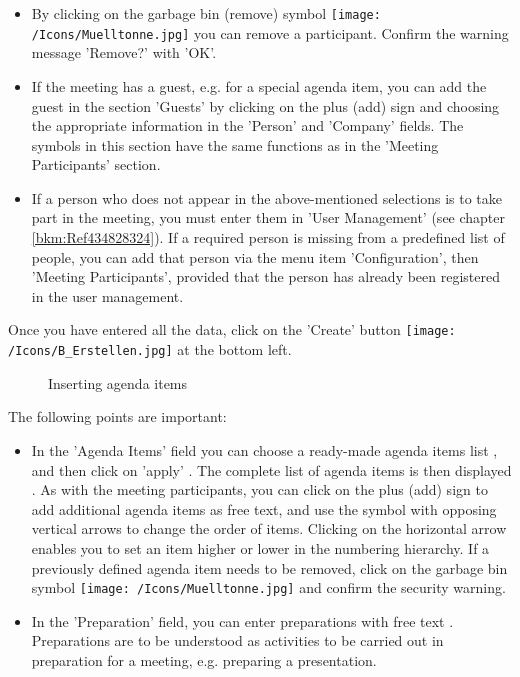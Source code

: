 \begin{itemize}
\item 
By clicking on the garbage bin (remove) symbol \texttt{[image: /Icons/Muelltonne.jpg]}  you can remove a participant. Confirm the warning message 'Remove?' with 'OK'.
\item 
If the meeting has a guest, e.g. for a special agenda item, you can add the guest in the section 'Guests' by clicking on the plus (add) sign and choosing the appropriate information in the 'Person' and 'Company' fields. The symbols in this section have the same functions as in the 'Meeting Participants' section.
\item 
If a person who does not appear in the above-mentioned selections is to take part in the meeting, you must enter them in 'User Management' (see chapter \ref{bkm:Ref434828324}). If a required person is missing from a predefined list of people, you can add that person via the menu item 'Configuration', then 'Meeting Participants', provided that the person has already been registered in the user management.
\end{itemize}

Once you have entered all the data, click on the 'Create' button \texttt{[image: /Icons/B\_Erstellen.jpg]} at the bottom left.

\begin{figure}[H]
\caption{Inserting agenda items}
\end{figure}

The following points are important:

\begin{itemize}
\item 
In the 'Agenda Items' field you can choose a ready-made agenda items list , and then click on 'apply' . The complete list of agenda items is then displayed . As with the meeting participants, you can click on the plus (add) sign  to add additional agenda items as free text, and use the symbol with opposing vertical arrows  to change the order of items. Clicking on the horizontal arrow  enables you to set an item higher or lower in the numbering hierarchy. If a previously defined agenda item needs to be removed, click on the garbage bin symbol \texttt{[image: /Icons/Muelltonne.jpg]}  and confirm the security warning.
\item 
In the 'Preparation' field, you can enter preparations with free text . Preparations are to be understood as activities to be carried out in preparation for a meeting, e.g. preparing a presentation.
\end{itemize}

